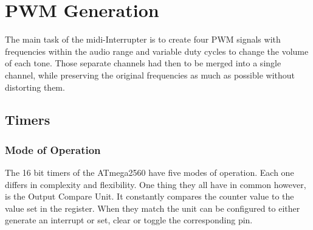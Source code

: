 \setchapterpreamble[u]{\margintoc}

\chapter{PWM Generation}

The main task of the \gls{midi}-Interrupter is to create four PWM signals with frequencies within the audio range and variable duty cycles to change the volume of each tone. Those separate channels had then to be merged into a single channel, while preserving the original frequencies as much as possible without distorting them.

\section{Timers}

\subsection{Mode of Operation}

The 16 bit timers of the ATmega2560 have five modes of operation. Each one differs in complexity and flexibility. One thing they all have in common however, is the Output Compare Unit. It constantly compares the counter value to the value set in the  register. When they match the unit can be configured to either generate an interrupt or set, clear or toggle the corresponding  pin.

